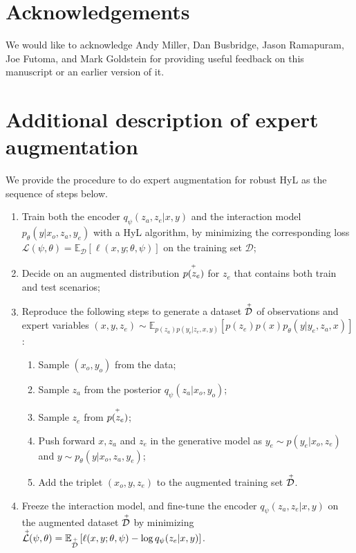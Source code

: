 \documentclass{article}
\begin{document}
\section*{Acknowledgements}
We would like to acknowledge Andy Miller, Dan Busbridge, Jason Ramapuram, Joe Futoma, and Mark Goldstein for providing useful feedback on this manuscript or an earlier version of it. 





\clearpage
\onecolumn
\appendix
\section{Additional description of expert augmentation}\label{app:ahm_desc}
We provide the procedure to do expert augmentation for robust HyL as the sequence of steps below.
\begin{enumerate}
    \item Train both the encoder $q_\psi(z_a, z_e|x, y)$ and the interaction model $p_\theta(y|x_o, z_a, y_e)$ with a HyL algorithm, by minimizing the corresponding loss $\mathcal{L}(\psi, \theta) = \mathbb{E}_{\mathcal{D}}\left[\ell(x, y; \theta, \psi)\right]$ on the training set $\mathcal{D}$;
    \item Decide on an augmented distribution $\accentset{+}{p(z_e)}$ for $z_e$ that contains both train and test scenarios;
    \item Reproduce the following steps to generate a dataset $\accentset{+}{\mathcal{D}}$ of observations and expert variables $(x, y, z_e) \sim \mathbb{E}_{p(z_a)p(y_e|z_e, x, y)}\left[ p(z_e) p(x) p_\theta(y|y_e, z_a, x)\right]$:
    \begin{enumerate}
        \item Sample $(x_o, y_o)$ from the data;
        \item Sample $z_a$ from the posterior $q_\psi(z_a|x_o, y_o)$;
        \item Sample $z_e$ from $\accentset{+}{p(z_e)}$;
        \item Push forward $x, z_a$ and $z_e$ in the generative model as $y_e \sim p(y_e|x_o, z_e)$ and $y \sim p_\theta(y|x_o, z_a, y_e)$;
        \item Add the triplet $(x_o, y, z_e)$ to the augmented training set $\accentset{+}{\mathcal{D}}$.
    \end{enumerate}
    \item Freeze the interaction model, and fine-tune the encoder $q_\psi(z_a, z_e|x, y)$ on the augmented dataset $\accentset{+}{\mathcal{D}}$ by minimizing $\accentset{+}{\mathcal{L}}(\psi, \theta) = \mathbb{E}_{\accentset{+}{\mathcal{D}}}\left[\ell(x, y; \theta, \psi) - \log q_\psi(z_e|x, y)\right]$.
\end{enumerate}
\end{document}
